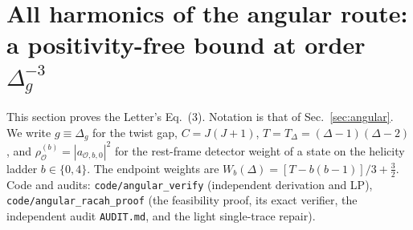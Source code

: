 \section{All harmonics of the angular route: a positivity-free bound at order \texorpdfstring{$\Delta_g^{-3}$}{Delta g^-3}}
\label{sec:allk}

This section proves the Letter's Eq.~(3). Notation is that of Sec.~\ref{sec:angular}. We write $g\equiv\Delta_g$ for the twist gap,
$C=J(J+1)$, $T=T_\Delta=(\Delta-1)(\Delta-2)$, and $\rho^{(b)}_{\mathcal O}=|a_{\mathcal O,b,0}|^2$ for the rest-frame detector weight of a state on the
helicity ladder $b\in\{0,4\}$. The endpoint weights are $W_b(\Delta)=[T-b(b-1)]/3+\tfrac32$. Code and audits: \texttt{code/angular\_verify}
(independent derivation and LP), \texttt{code/angular\_racah\_proof} (the feasibility proof, its exact verifier, the independent audit
\texttt{AUDIT.md}, and the light single-trace repair).

